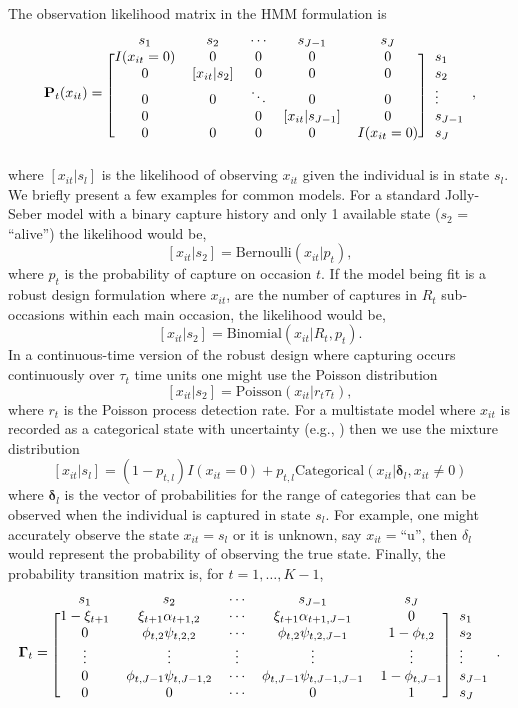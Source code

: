 \documentclass[12pt]{article}
\newcommand{\bP}{\ensuremath{\mathbf{P}}}
\newcommand{\bG}{\ensuremath{\boldsymbol{\Gamma}}}
\newcommand{\bd}{\ensuremath{\boldsymbol{\delta}}}
\begin{document}
The observation likelihood matrix in the HMM formulation is
%
\[
\bP_t(x_{it}) = \begin{blockarray}{cccccc} 
s_1 & s_2 & \cdots & s_{J-1} & s_J \\
\begin{block}{[ccccc]l}
I(x_{it}=0) & 0 & 0 & 0 & 0 & s_1\\
0 & [x_{it} | s_2] & 0 & 0 & 0 & s_2\\
0 &  0 & \ddots & 0 & 0 & \vdots \\
0 &  & 0 & [x_{it} | s_{J-1}] & 0 & s_{J-1}\\
0 & 0 & 0 & 0 & I(x_{it}=0) & s_J\\
\end{block}
\end{blockarray},
\]
%
where $[x_{it}|s_l]$ is the likelihood of observing $x_{it}$ given the individual is in state $s_l$. We briefly present a few examples for common models. For a standard Jolly-Seber model with a binary capture history and only 1 available state ($s_2$ = ``alive'') the likelihood would be,
\[
[x_{it}|s_2] = \text{Bernoulli}(x_{it}|p_t),
\]
where $p_t$ is the probability of capture on occasion $t$. If the model being fit is a robust design formulation \citep{xxx} where $x_{it}$, are the number of captures in $R_t$ sub-occasions within each main occasion, the likelihood would be,
\[
[x_{it}|s_2] = \text{Binomial}(x_{it}|R_t, p_t). 
\]
In a continuous-time version of the robust design where capturing occurs continuously over $\tau_t$ time units one might use the Poisson distribution 
\[
[x_{it}|s_2] = \text{Poisson}(x_{it}|r_t\tau_t),
\]
where $r_t$ is the Poisson process detection rate. For a multistate model where $x_{it}$ is recorded as a categorical state with uncertainty (e.g., \citealt{johnson2016multivariate}) then we use the mixture distribution
\[
[x_{it}|s_l] = (1-p_{t,l})I(x_{it}=0) + p_{t,l}\text{Categorical}(x_{it}|\bd_l,x_{it}\ne0)
\]
where $\bd_l$ is the vector of probabilities for the range of categories that can be observed when the individual is captured in state $s_l$. For example, one might accurately observe the state $x_{it} = s_l$ or it is unknown, say $x_{it} = $``u'', then $\delta_l$ would represent the probability of observing the true state. Finally, the probability transition matrix is, for $t=1,\dots,K-1$,
%
\begin{equation}
\label{eq.gamma.mat}
\bG_t = \begin{blockarray}{cccccc} 
s_1 & s_2 & \cdots & s_{J-1} & s_J \\
\begin{block}{[ccccc]l}
1-\xi_{t+1} & \xi_{t+1}\alpha_{t+1,2} & \cdots & \xi_{t+1}\alpha_{t+1,J-1} & 0 & s_1\\
0 & \phi_{t,2} \psi_{t,2,2} & \cdots & \phi_{t,2} \psi_{t,2,J-1} & 1-\phi_{t,2} & s_2\\
\vdots &  \vdots & \vdots &\vdots & \vdots & \vdots \\
0 & \phi_{t,J-1} \psi_{t,J-1,2} & \cdots & \phi_{t,J-1} \psi_{t,J-1,J-1} & 1-\phi_{t,J-1} & s_{J-1}\\
0 & 0 & \cdots & 0 & 1 & s_J\\
\end{block}
\end{blockarray}.
\end{equation}
\end{document}
